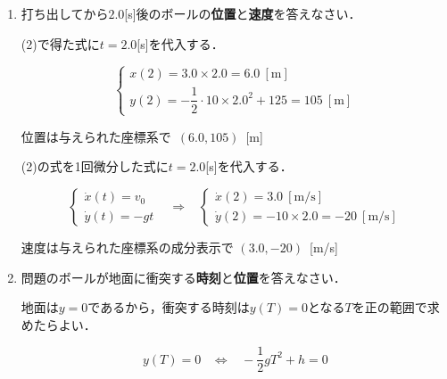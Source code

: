 \documentclass[a4paper,11pt]{ltjsarticle}
\begin{document}
\begin{enumerate}
\begin{enumerate}[label=(\arabic*)]
        \item 打ち出してから$2.0$[s]後のボールの\textbf{位置}と\textbf{速度}を答えなさい．

        \vspace{5pt}

        (2)で得た式に$t=2.0$[s]を代入する．

        \begin{equation*}
            \begin{cases}
                x(2)=3.0 \times 2.0=6.0\ [\mathrm{m}] \\
                y(2)=-\dfrac{1}{2} \cdot 10 \times 2.0^2+125=105\ [\mathrm{m}]
            \end{cases}
        \end{equation*}

        位置は与えられた座標系で\ $(6.0,105)$\ [m]

        \vspace{5pt}

        (2)の式を1回微分した式に$t=2.0$[s]を代入する．

        \begin{equation*}
            \begin{cases}
                \dot{x}(t)=v_0 \\
                \dot{y}(t)=-gt
            \end{cases}
            \hspace{10pt} \Rightarrow \hspace{10pt}
            \begin{cases}
                \dot{x}(2)=3.0\ [\mathrm{m/s}] \\
                \dot{y}(2)=-10 \times 2.0 = -20\ [\mathrm{m/s}]
            \end{cases}
        \end{equation*}

        速度は与えられた座標系の成分表示で $(3.0,-20)$\ [m/s]

        \vspace{5pt}

        \item 問題のボールが地面に衝突する\textbf{時刻}と\textbf{位置}を答えなさい．
        
        \vspace{5pt}

        地面は$y=0$であるから，衝突する時刻は$y(T)=0$となる$T$を正の範囲で求めたらよい．

        \begin{equation*}
            y(T)=0 \hspace{10pt} \Leftrightarrow \hspace{10pt}
            -\dfrac{1}{2}gT^2+h=0
        \end{equation*}


\end{enumerate}
\end{enumerate}
\end{document}
